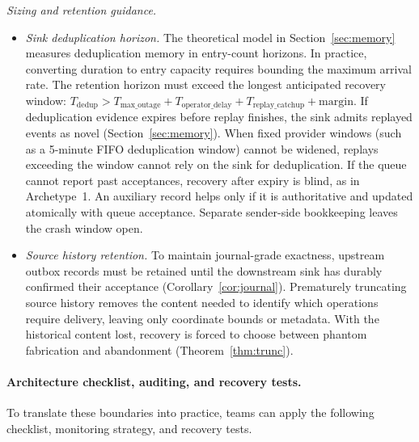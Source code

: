 \documentclass[sigplan,10pt]{acmart}
\theoremstyle{plain}
\theoremstyle{definition}
\begin{document}
\emph{Sizing and retention guidance.}
\begin{itemize}
\item \emph{Sink deduplication horizon.} The theoretical model in
  Section~\ref{sec:memory} measures deduplication memory in entry-count
  horizons. In practice, converting duration to entry capacity requires
  bounding the maximum arrival rate. The retention horizon must exceed the
  longest anticipated recovery window:
  $T_{\mathrm{dedup}} > T_{\mathrm{max\_outage}} + T_{\mathrm{operator\_delay}}
  + T_{\mathrm{replay\_catchup}} + \mathrm{margin}$.
  If deduplication evidence expires before replay finishes, the sink admits
  replayed events as novel (Section~\ref{sec:memory}). When fixed provider
  windows (such as a 5-minute FIFO deduplication window) cannot be widened,
  replays exceeding the window cannot rely on the sink for deduplication.
  If the queue cannot report past acceptances, recovery after expiry is blind,
  as in Archetype~1. An auxiliary record helps only if it is authoritative and
  updated atomically with queue acceptance. Separate sender-side bookkeeping
  leaves the crash window open.
\item \emph{Source history retention.} To maintain journal-grade exactness,
  upstream outbox records must be retained until the downstream sink has
  durably confirmed their acceptance (Corollary~\ref{cor:journal}).
  Prematurely truncating source history removes the content needed to identify
  which operations require delivery, leaving only coordinate bounds or metadata.
  With the historical content lost, recovery is forced to choose between phantom
  fabrication and abandonment (Theorem~\ref{thm:trunc}).
\end{itemize}

\paragraph{Architecture checklist, auditing, and recovery tests.}
To translate these boundaries into practice, teams can apply the following
checklist, monitoring strategy, and recovery tests.
\end{document}
